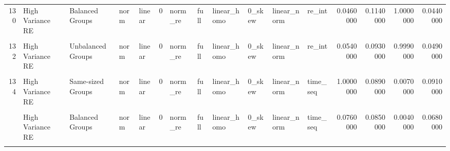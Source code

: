 \documentclass[12pt]{article}
\begin{document}
\begin{table}
{\begin{tabular}[t]{rllllrllllllrrrr}
130 & High Variance RE & Balanced Groups & norm & linear & 0 & norm\_re & full & linear\_homo & 0\_skew & linear\_norm & re\_int & 0.0460000 & 0.1140000 & 1.0000000 & 0.0440000\\
\addlinespace
\cellcolor{gray!6}{131} & \cellcolor{gray!6}{High Variance Error} & \cellcolor{gray!6}{Unbalanced Groups} & \cellcolor{gray!6}{norm} & \cellcolor{gray!6}{linear} & \cellcolor{gray!6}{0} & \cellcolor{gray!6}{norm\_re} & \cellcolor{gray!6}{full} & \cellcolor{gray!6}{linear\_homo} & \cellcolor{gray!6}{0\_skew} & \cellcolor{gray!6}{linear\_norm} & \cellcolor{gray!6}{re\_int} & \cellcolor{gray!6}{0.0480000} & \cellcolor{gray!6}{0.0920000} & \cellcolor{gray!6}{1.0000000} & \cellcolor{gray!6}{0.0470000}\\
132 & High Variance RE & Unbalanced Groups & norm & linear & 0 & norm\_re & full & linear\_homo & 0\_skew & linear\_norm & re\_int & 0.0540000 & 0.0930000 & 0.9990000 & 0.0490000\\
\cellcolor{gray!6}{133} & \cellcolor{gray!6}{High Variance Error} & \cellcolor{gray!6}{Same-sized Groups} & \cellcolor{gray!6}{norm} & \cellcolor{gray!6}{linear} & \cellcolor{gray!6}{0} & \cellcolor{gray!6}{norm\_re} & \cellcolor{gray!6}{full} & \cellcolor{gray!6}{linear\_homo} & \cellcolor{gray!6}{0\_skew} & \cellcolor{gray!6}{linear\_norm} & \cellcolor{gray!6}{time\_seq} & \cellcolor{gray!6}{0.0800000} & \cellcolor{gray!6}{0.0930000} & \cellcolor{gray!6}{0.5530000} & \cellcolor{gray!6}{0.0470000}\\
134 & High Variance RE & Same-sized Groups & norm & linear & 0 & norm\_re & full & linear\_homo & 0\_skew & linear\_norm & time\_seq & 1.0000000 & 0.0890000 & 0.0070000 & 0.0910000\\
\cellcolor{gray!6}{135} & \cellcolor{gray!6}{High Variance Error} & \cellcolor{gray!6}{Balanced Groups} & \cellcolor{gray!6}{norm} & \cellcolor{gray!6}{linear} & \cellcolor{gray!6}{0} & \cellcolor{gray!6}{norm\_re} & \cellcolor{gray!6}{full} & \cellcolor{gray!6}{linear\_homo} & \cellcolor{gray!6}{0\_skew} & \cellcolor{gray!6}{linear\_norm} & \cellcolor{gray!6}{time\_seq} & \cellcolor{gray!6}{0.0430000} & \cellcolor{gray!6}{0.1020000} & \cellcolor{gray!6}{0.6490000} & \cellcolor{gray!6}{0.0570000}\\
\addlinespace
136 & High Variance RE & Balanced Groups & norm & linear & 0 & norm\_re & full & linear\_homo & 0\_skew & linear\_norm & time\_seq & 0.0760000 & 0.0850000 & 0.0040000 & 0.0680000\\
\cellcolor{gray!6}{137} & \cellcolor{gray!6}{High Variance Error} & \cellcolor{gray!6}{Unbalanced Groups} & \cellcolor{gray!6}{norm} & \cellcolor{gray!6}{linear} & \cellcolor{gray!6}{0} & \cellcolor{gray!6}{norm\_re} & \cellcolor{gray!6}{full} & \cellcolor{gray!6}{linear\_homo} & \cellcolor{gray!6}{0\_skew} & \cellcolor{gray!6}{linear\_norm} & \cellcolor{gray!6}{time\_seq} & \cellcolor{gray!6}{0.0600000} & \cellcolor{gray!6}{0.1020000} & \cellcolor{gray!6}{0.6950000} & \cellcolor{gray!6}{0.0450000}\\

\end{tabular}}
\end{table}
\end{document}
